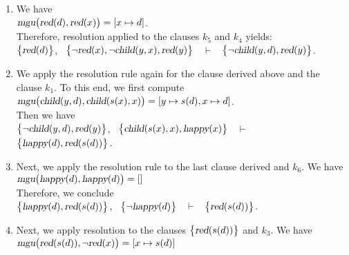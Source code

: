 \begin{enumerate}
\item We have
      \\[0.2cm]
      \hspace*{1.3cm}
      $\textsl{mgu}\bigl(\textsl{red}(d), \textsl{red}(x)\bigr) = [x \mapsto d]$.
      \\[0.2cm]
      Therefore, resolution applied to the clauses  $k_5$ and $k_4$ yields:
      \\[0.2cm]
      \hspace*{1.3cm}
      $\bigl\{\textsl{red}(d)\bigl\}$, \ $\bigl\{\neg \textsl{red}(x), \neg \textsl{child}(y,x),
       \textsl{red}(y)\bigl\}$ \ $\vdash$ \ $\bigl\{\neg \textsl{child}(y,d), \textsl{red}(y)\bigl\}$.
\item We apply the resolution rule again for the clause derived above and the clause  $k_1$.
      To this end, we first compute
      \\[0.2cm]
      \hspace*{1.3cm}
      $\textsl{mgu}\bigl(\textsl{child}(y,d), \textsl{child}(s(x),x)\bigr) = 
       [y \mapsto s(d), x \mapsto d]$.
      \\[0.2cm]
      Then we have
      \\[0.2cm]
      \hspace*{1.3cm}
       $\bigl\{\neg \textsl{child}(y,d), \textsl{red}(y)\bigl\}$, \ 
       $\bigl\{\textsl{child}(s(x),x), \textsl{happy}(x)\bigl\}$ \ $\vdash$ \ 
       $\bigl\{\textsl{happy}(d), \textsl{red}(s(d))\bigl\}$.
\item Next, we apply the resolution rule to the last clause derived and  $k_6$. We have
      \\[0.2cm]
      \hspace*{1.3cm}
      $\textsl{mgu}\bigl(\textsl{happy}(d), \textsl{happy}(d)\bigr) = []$
      \\[0.2cm]
      Therefore, we conclude
      \\[0.2cm]
      \hspace*{1.3cm}
      $\bigl\{\textsl{happy}(d), \textsl{red}(s(d))\bigl\}$, \ $\bigl\{\neg \textsl{happy}(d)\bigl\}$ \ $\vdash$ \ $\bigl\{\textsl{red}(s(d))\bigl\}$.
\item Next, we apply resolution to the clauses $\bigl\{\textsl{red}(s(d))\bigl\}$ and $k_3$.
      We have
      \\[0.2cm]
      \hspace*{1.3cm}
      $\textsl{mgu}\bigl(\textsl{red}(s(d)), \neg \textsl{red}(x)\bigr) = [x \mapsto s(d)]$

\end{enumerate}
